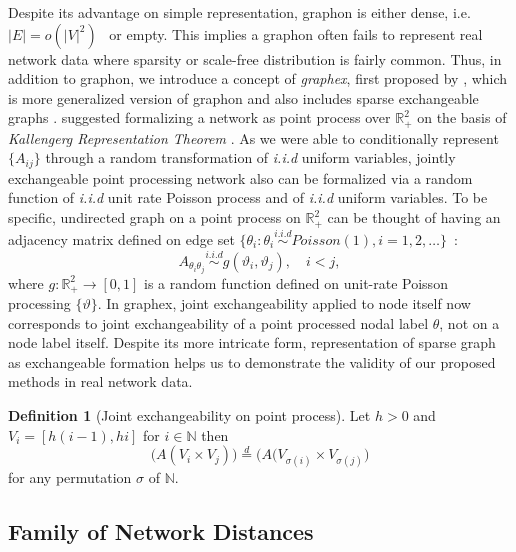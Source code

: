\documentclass[12pt]{article}
\theoremstyle{definition}
\newtheorem{definition}{Definition}[section]
\begin{document}
Despite its advantage on simple representation, graphon is either dense, i.e. $|E| = o(|V|^2)$~\citep{veitch2015class} or empty. This implies a graphon often fails to represent real network data where sparsity or scale-free distribution is fairly common. Thus, in addition to graphon, we introduce a concept of \textit{graphex}, first proposed by \cite{veitch2015class}, which is more generalized version of graphon and also includes sparse exchangeable graphs \citep{caron2014sparse}.  \cite{caron2014sparse} suggested formalizing a network as point process over $\mathbb{R}^2_{+}$ on the basis of \textit{Kallengerg Representation Theorem} \citep{kallenberg1990exchangeable}. As we were able to conditionally represent $\{ A_{ij} \}$ through a random transformation of \textit{i.i.d} uniform variables, jointly exchangeable point processing network also can be formalized via a random function of \textit{i.i.d} unit rate Poisson process and of \textit{i.i.d} uniform variables. 
To be specific, undirected graph on a point process on $\mathbb{R}^2_{+}$ can be thought of having an adjacency matrix defined on edge set $\{ \theta_{i} :  \theta_{i}  \overset{i.i.d}{\sim}  Poisson(1), i = 1,2,\ldots \}$~\citep{kallenberg1990exchangeable}:
\begin{equation}
A_{\theta_{i} \theta_{j}} \overset{i.i.d}{\sim} g(\vartheta_{i}, \vartheta_{j}), \quad i < j,
\label{eq:graphon}
\end{equation}
where $g : \mathbb{R}^{2}_{+} \rightarrow [0,1]$ is a random function defined on unit-rate Poisson processing $\{ \vartheta \}$. In graphex, joint exchangeability applied to node itself now corresponds to joint exchangeability of a point processed nodal label $\theta$, not on a node label itself. Despite its more intricate form, representation of sparse graph as exchangeable formation helps us to demonstrate the validity of our proposed methods in real network data. 
\begin{definition}[Joint exchangeability on point process]
	\label{point}
	Let $h > 0$ and  $V_{i} = [h(i-1), hi ]$ for $i \in \mathbb{N}$ then
	\begin{equation}
	\big( A( V_{i} \times V_{j}  )   \big)  \stackrel{d}{=} \big( A( V_{\sigma(i)} \times V_{\sigma(j)}     \big)
	\end{equation}	
	for any permutation $\sigma$ of $\mathbb{N}$.		
\end{definition}

\subsection{Family of Network Distances}	
\end{document}
